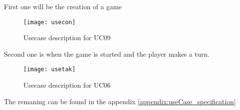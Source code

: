 First one will be the creation of a game\\

\begin{figure}[h]
\centering
\texttt{[image: usecon]}
\caption{Usecase description for UC09}
\end{figure}
\clearpage

Second one is when the game is started and the player makes a turn.\\

\begin{figure}[h]
\centering
\texttt{[image: usetak]}
\caption{Usecase description for UC06}
\end{figure}
The remaning can be found in the appendix \ref{appendix:useCase_specification}

